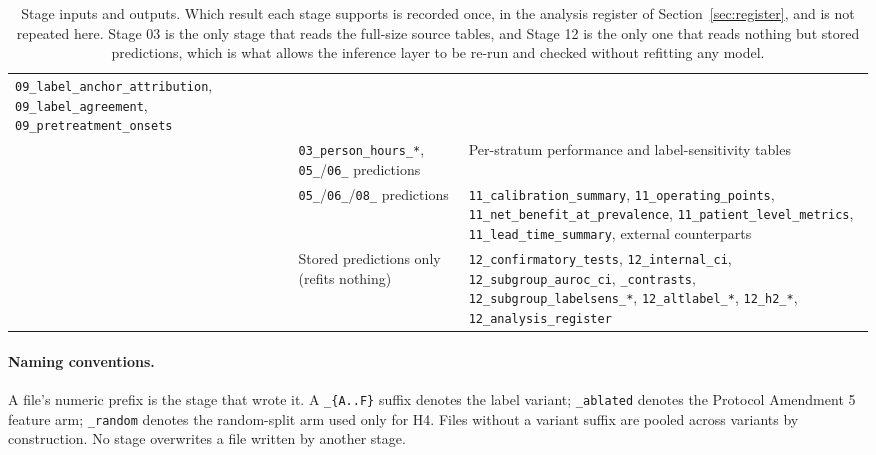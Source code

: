 \begin{table}[H]
\begin{tabularx}{\textwidth}{p{0.9cm}p{4.2cm}X}
        \texttt{09\_label\_anchor\_attribution},
        \texttt{09\_label\_agreement}, \texttt{09\_pretreatment\_onsets} \\
        \addlinespace
        10 & \texttt{03\_person\_hours\_*}, \texttt{05\_}/\texttt{06\_}
        predictions &
        Per-stratum performance and label-sensitivity tables \\
        \addlinespace
        11 & \texttt{05\_}/\texttt{06\_}/\texttt{08\_} predictions &
        \texttt{11\_calibration\_summary}, \texttt{11\_operating\_points},
        \texttt{11\_net\_benefit\_at\_prevalence},
        \texttt{11\_patient\_level\_metrics},
        \texttt{11\_lead\_time\_summary}, external counterparts \\
        \addlinespace
        12 & Stored predictions only (refits nothing) &
        \texttt{12\_confirmatory\_tests}, \texttt{12\_internal\_ci},
        \texttt{12\_subgroup\_auroc\_ci}, \texttt{\_contrasts},
        \texttt{12\_subgroup\_labelsens\_*}, \texttt{12\_altlabel\_*},
        \texttt{12\_h2\_*}, \texttt{12\_analysis\_register} \\
        \bottomrule
    \end{tabularx}
    \caption{Stage inputs and outputs. Which result each stage supports is
    recorded once, in the analysis register of
    Section~\ref{sec:register}, and is not repeated here. Stage 03 is
    the only stage that reads the full-size source tables, and Stage 12 is the
    only one that reads nothing but stored predictions, which is what allows
    the inference layer to be re-run and checked without refitting any model.}
    \label{tab:stage_reference}
\end{table}

\paragraph{Naming conventions.} A file's numeric prefix is the stage that wrote
it. A \texttt{\_\{A..F\}} suffix denotes the label variant; \texttt{\_ablated}
denotes the Protocol Amendment 5 feature arm; \texttt{\_random} denotes the
random-split arm used only for H4. Files without a variant suffix are pooled
across variants by construction. No stage overwrites a file written by another
stage.
